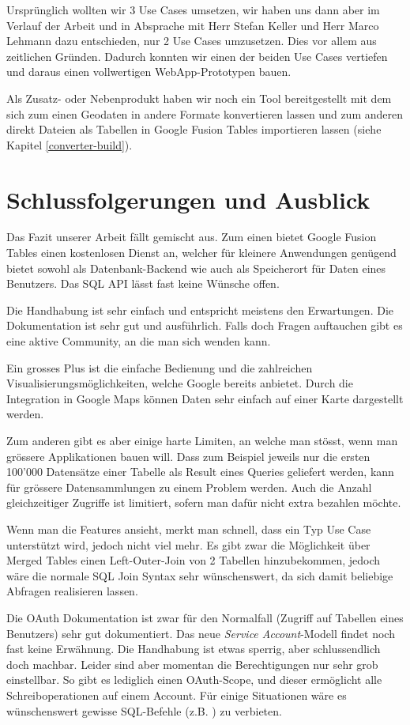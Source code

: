 Ursprünglich wollten wir 3 Use Cases umsetzen, wir haben uns dann aber im Verlauf der Arbeit und in Absprache mit Herr Stefan Keller und Herr Marco Lehmann dazu entschieden, nur 2 Use Cases umzusetzen. Dies vor allem aus zeitlichen Gründen. Dadurch konnten wir einen der beiden Use Cases vertiefen und daraus einen vollwertigen WebApp-Prototypen bauen.

Als Zusatz- oder Nebenprodukt haben wir noch ein Tool bereitgestellt mit dem sich zum einen Geodaten in andere Formate konvertieren lassen und zum anderen direkt Dateien als Tabellen in Google Fusion Tables importieren lassen (siehe Kapitel \ref{converter-build}).

\section{Schlussfolgerungen und Ausblick}
Das Fazit unserer Arbeit fällt gemischt aus. Zum einen bietet Google Fusion Tables einen kostenlosen Dienst an, welcher für kleinere Anwendungen genügend bietet sowohl als Datenbank-Backend wie auch als Speicherort für Daten eines Benutzers. Das SQL API lässt fast keine Wünsche offen.

Die Handhabung ist sehr einfach und entspricht meistens den Erwartungen. Die Dokumentation ist sehr gut und ausführlich. Falls doch Fragen auftauchen gibt es eine aktive Community, an die man sich wenden kann. 

Ein grosses Plus ist die einfache Bedienung und die zahlreichen Visualisierungsmöglichkeiten, welche Google bereits anbietet. Durch die Integration in Google Maps können Daten sehr einfach auf einer Karte dargestellt werden.

Zum anderen gibt es aber einige harte Limiten, an welche man stösst, wenn man grössere Applikationen bauen will. Dass zum Beispiel jeweils nur die ersten 100'000 Datensätze einer Tabelle als Result eines Queries geliefert werden, kann für grössere Datensammlungen zu einem Problem werden. Auch die Anzahl gleichzeitiger Zugriffe ist limitiert, sofern man dafür nicht extra bezahlen möchte.

Wenn man die Features ansieht, merkt man schnell, dass ein Typ Use Case unterstützt wird, jedoch nicht viel mehr. Es gibt zwar die Möglichkeit über Merged Tables einen Left-Outer-Join von 2 Tabellen hinzubekommen, jedoch wäre die normale SQL Join Syntax sehr wünschenswert, da sich damit beliebige Abfragen realisieren lassen. 

Die OAuth Dokumentation ist zwar für den Normalfall (Zugriff auf Tabellen eines Benutzers) sehr gut dokumentiert. Das neue \emph{Service Account}-Modell findet noch fast keine Erwähnung. Die Handhabung ist etwas sperrig, aber schlussendlich doch machbar. Leider sind aber momentan die Berechtigungen nur sehr grob einstellbar. So gibt es lediglich einen OAuth-Scope, und dieser ermöglicht alle Schreiboperationen auf einem Account. Für einige Situationen wäre es wünschenswert gewisse SQL-Befehle (z.B. ) zu verbieten.

